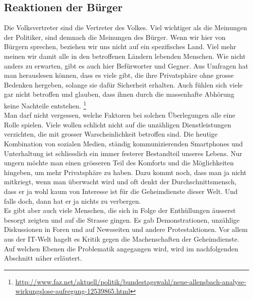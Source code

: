 \subsection{Reaktionen der Bürger}
Die Volksvertreter sind die Vertreter des Volkes. Viel wichtiger als die Meinungen der Politiker, sind demnach die Meinungen des Bürger. Wenn wir hier von Bürgern sprechen, beziehen wir uns nicht auf ein spezifisches Land. Viel mehr meinen wir damit alle in den betroffenen Ländern lebenden Menschen. Wie nicht anders zu erwarten, gibt es auch hier Befürworter und Gegner. Aus Umfragen hat man herauslesen können, dass es viele gibt, die ihre Privatsphäre ohne grosse Bedenken hergeben, solange sie dafür Sicherheit erhalten. Auch fühlen sich viele gar nicht betroffen und glauben, dass ihnen durch die massenhafte Abhörung keine Nachteile entstehen.
\footnote{\url{http://www.faz.net/aktuell/politik/bundestagswahl/neue-allensbach-analyse-wirkungslose-aufregung-12539865.html}}
\\
Man darf nicht vergessen, welche Faktoren bei solchen Überlegungen alle eine Rolle spielen. Viele wollen schlicht nicht auf die unzähligen Dienstleistungen verzichten, die mit grosser Warscheinlichkeit betroffen sind. Die heutige Kombination von sozialen Medien, ständig kommunizierenden Smartphones und Unterhaltung ist schliesslich ein immer festerer Bestandteil unseres Lebens. Nur ungern möchte man einen grösseren Teil des Komforts und die Möglichkeiten hingeben, um mehr Privatsphäre zu haben. Dazu kommt noch, dass man ja nicht mitkriegt, wenn man überwacht wird und oft denkt der Durchschnittsmensch, dass er ja wohl kaum von Interesse ist für die Geheimdienste dieser Welt. Und falls doch, dann hat er ja nichts zu verbergen.
\\
Es gibt aber auch viele Menschen, die sich in Folge der Enthüllungen äusserst besorgt zeigten und auf die Strasse gingen. Es gab Demonstrationen, unzählige Diskussionen in Foren und auf Newsseiten und andere Protestaktionen. Vor allem aus der IT-Welt hagelt es Kritik gegen die Machenschaften der Geheimdienste. Auf welchen Ebenen die Problematik angegangen wird, wird im nachfolgenden Abschnitt näher erläutert.
